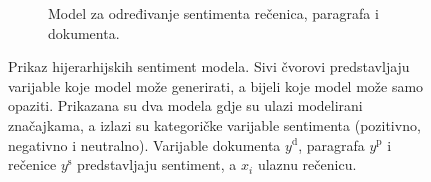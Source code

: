 \begin{figure}
\begin{subfigure}[b]{1\textwidth}
\begin{tikzpicture}[scale=0.75,every node/.style={transform shape}]
\end{tikzpicture}
\caption{Model za određivanje sentimenta rečenica, paragrafa i dokumenta.}
\label{fig:sentimentmodels:docparsent}
\end{subfigure}

\caption[Prikaz hijerarhijskih sentiment modela.]{Prikaz hijerarhijskih
sentiment modela. Sivi čvorovi predstavljaju varijable koje model može
generirati, a bijeli koje model može samo opaziti. Prikazana su dva modela gdje
su ulazi modelirani značajkama, a izlazi su kategoričke varijable sentimenta
(pozitivno, negativno i neutralno). Varijable dokumenta $y^{\text{d}}$,
paragrafa $y^{\text{p}}$ i rečenice $y^{\text{s}}$ predstavljaju sentiment, a
$x_i$ ulaznu rečenicu.}
\label{fig:sentimentmodels}
\end{figure}
